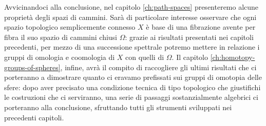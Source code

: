 Avvicinandoci alla conclusione, nel capitolo \ref{ch:path-spaces} presenteremo alcune proprietà degli spazi di cammini. Sarà di particolare interesse osservare che ogni spazio topologico semplicemente connesso $X$ è base di una fibrazione avente per fibra il suo spazio di cammini chiusi $\Omega$: grazie ai risultati presentati nei capitoli precedenti, per mezzo di una successione spettrale potremo mettere in relazione i gruppi di omologia e coomologia di $X$ con quelli di $\Omega$. Il capitolo \ref{ch:homotopy-groups-of-spheres}, infine, avrà il compito di raccogliere gli ultimi risultati che ci porteranno a dimostrare quanto ci eravamo prefissati sui gruppi di omotopia delle sfere: dopo aver precisato una condizione tecnica di tipo topologico che giustifichi le costruzioni che ci serviranno, una serie di passaggi sostanzialmente algebrici ci porteranno alla conclusione, sfruttando tutti gli strumenti sviluppati nei precedenti capitoli.

